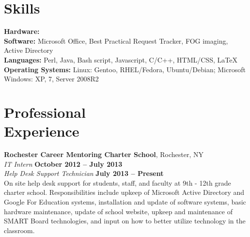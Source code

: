 \documentclass[margin,line]{resume}
\begin{document}
\begin{resume}
    \section{\mysidestyle Skills} 
    \textbf{Hardware:}
    \\
    \textbf{Software:}
    Microsoft Office, Best Practical Request Tracker, FOG imaging, Active Directory\\ 
    \textbf{Languages:} 
    Perl, Java, Bash script, Javascript, C/C++, HTML/CSS, \LaTeX\\
    \textbf{Operating Systems:}
    Linux: Gentoo, RHEL/Fedora, Ubuntu/Debian; Microsoft Windows: XP, 7, Server 2008R2\\ 

    \section{\mysidestyle Professional\\Experience}

    \textbf{Rochester Career Mentoring Charter School}, Rochester, NY \vspace{2mm}\\\vspace{1mm}%
    \textsl{IT Intern} \hfill \textbf{October 2012 -- July 2013}\\\vspace{0.5mm}%
    \textsl{Help Desk Support Technician} \hfill \textbf{July 2013 -- Present}\\\vspace{0.5mm}%
    On site help desk support for students, staff, and faculty at 9th - 12th grade charter school.
    Responsibilities include upkeep of Microsoft Active Directory and Google For Education systems,
    installation and update of software systems, basic hardware maintenance, update of school website,
    upkeep and maintenance of SMART Board technologies, and input on how to better utilize technology in
    the classroom.


\end{resume}
\end{document}
